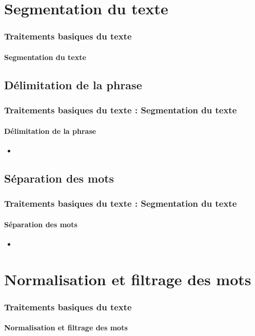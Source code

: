 \documentclass[xcolor=table]{beamer}
\begin{document}
\section{Segmentation du texte}

\begin{frame}
\frametitle{Traitements basiques du texte}
\framesubtitle{Segmentation du texte}


\end{frame}

\subsection{Délimitation de la phrase}

\begin{frame}
\frametitle{Traitements basiques du texte : Segmentation du texte}
\framesubtitle{Délimitation de la phrase} 

\begin{itemize}
\item 
\end{itemize}

\end{frame}

\subsection{Séparation des mots}

\begin{frame}
\frametitle{Traitements basiques du texte : Segmentation du texte}
\framesubtitle{Séparation des mots}

\begin{itemize}
\item 
\end{itemize}

\end{frame}

\section{Normalisation et filtrage des mots}

\begin{frame}
\frametitle{Traitements basiques du texte}
\framesubtitle{Normalisation et filtrage des mots}


\end{frame}
\end{document}
